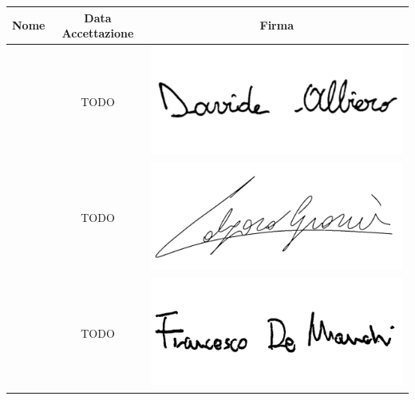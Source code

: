 \renewcommand{\arraystretch}{1}
	\begin{table}[H]
		\begin{center}
			\setlength{\aboverulesep}{0pt}
			\setlength{\belowrulesep}{0pt}
			\setlength{\extrarowheight}{.75ex}
			\begin{tabular}{ c c c}
				\rowcolor{AzzurroGruppo!30} 
				\textbf{Nome} & \textbf{Data Accettazione} & \textbf{Firma} \\
				\toprule
				
				\Davide{} & TODO & \includegraphics[scale = 0.5]{components/img/firme_membri/firma-da.png} \\
				\Giosue{} & TODO & \includegraphics[scale = 0.5]{components/img/firme_membri/firma-gc.png} \\
				\Francesco{} & TODO & \includegraphics[scale = 0.16]{components/img/firme_membri/firma-fdm.png} \\

\end{tabular}
\end{center}
\end{table}
